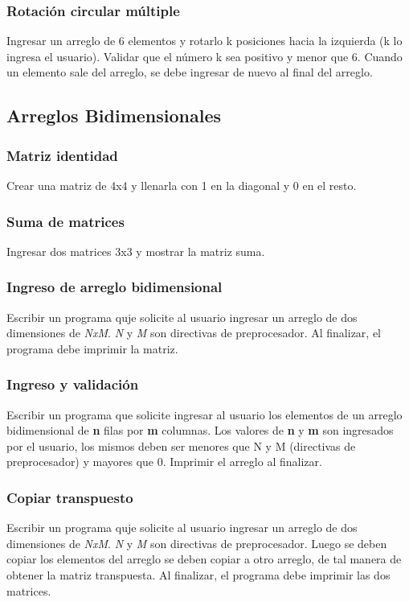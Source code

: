 \subsubsection{Rotación circular múltiple}
Ingresar un arreglo de 6 elementos y rotarlo k posiciones hacia la izquierda (k lo ingresa el usuario).
Validar que el número k sea positivo y menor que 6.
Cuando un elemento sale del arreglo, se debe ingresar de nuevo al final del arreglo.
\subsection*{Arreglos Bidimensionales}

\subsubsection{Matriz identidad}
Crear una matriz de 4x4 y llenarla con 1 en la diagonal y 0 en el resto.

\subsubsection{Suma de matrices}
Ingresar dos matrices 3x3 y mostrar la matriz suma.

\subsubsection{Ingreso de arreglo bidimensional}
Escribir un programa quje solicite al usuario ingresar un arreglo de dos dimensiones de \textit{NxM}. \textit{N} y \textit{M} son directivas de preprocesador. Al finalizar, el programa debe imprimir la matriz.

\subsubsection{Ingreso y validación}
Escribir un programa que solicite ingresar al usuario los elementos de un arreglo bidimensional de \textbf{n} filas por  \textbf{m} columnas. Los valores de \textbf{n} y \textbf{m} son ingresados por el usuario, los mismos deben ser menores que N y M (directivas de preprocesador) y mayores que 0. Imprimir el arreglo al finalizar.

\subsubsection{Copiar transpuesto}
Escribir un programa quje solicite al usuario ingresar un arreglo de dos dimensiones de \textit{NxM}. \textit{N} y \textit{M} son directivas de preprocesador. Luego se deben copiar los elementos del arreglo se deben copiar a otro arreglo, de tal manera de obtener la matriz transpuesta.
Al finalizar, el programa debe imprimir las dos matrices.

